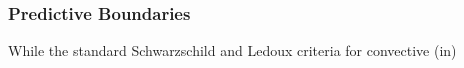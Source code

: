 {\color{brown}
\subsubsection{Predictive Boundaries}

While the standard Schwarzschild and Ledoux criteria for convective (in)

}